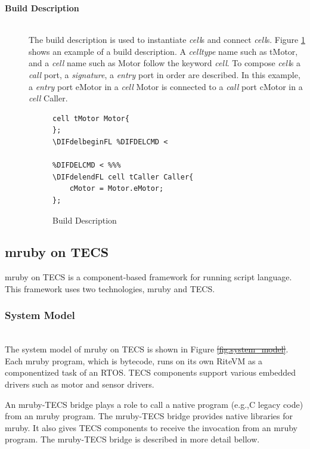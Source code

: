 \documentclass[conference,compsoc]{IEEEtran}
\providecommand{\DIFadd}[1]{{\protect\color{blue}\uwave{#1}}} %
\providecommand{\DIFdel}[1]{{\protect\color{red}\sout{#1}}}                      %
\providecommand{\DIFaddbegin}{} %
\providecommand{\DIFaddend}{} %
\providecommand{\DIFdelbegin}{} %
\providecommand{\DIFdelend}{} %
\providecommand{\DIFdelbeginFL}{} %
\providecommand{\DIFdelendFL}{} %
\begin{document}
\begin{description}
    \item[{\bf Build Description}]\mbox{}\\
        The build description is used to instantiate {\it cell}s and connect {\it cell}s.
        Figure \ref{build} shows an example of a build description.
        A {\it celltype} name such as tMotor, and a {\it cell} name such as Motor follow the keyword {\it cell}.
        To compose {\it cell}s a {\it call} port, a {\it signature}, a {\it entry} port in order are described.
        In this example, a {\it entry} port eMotor in a {\it cell} Motor is connected to a {\it call} port cMotor in a {\it cell} Caller.\\
\begin{figure}[t]
\centering
\begin{lstlisting}
cell tMotor Motor{
};
\DIFdelbeginFL %DIFDELCMD < 

%DIFDELCMD < %%%
\DIFdelendFL cell tCaller Caller{
    cMotor = Motor.eMotor;
};
\end{lstlisting}
\caption{Build Description}
\label{build}
\end{figure}

\end{description}

\subsection{mruby on TECS}
\label{sec:mruby on TECS}
mruby on TECS is a component-based framework for running script language.
This framework uses two technologies, mruby and TECS.

\subsubsection{System Model}\mbox{}\\

The system model of mruby on TECS is shown in Figure \DIFdelbegin \DIFdel{\ref{fig:system_model}}\DIFdelend \DIFaddbegin \DIFadd{\ref{fig:mrubyontecs}}\DIFaddend .
Each mruby program, which is bytecode, runs on its own RiteVM as a componentized task of an RTOS.
TECS components support various embedded drivers such as motor and sensor drivers.

An mruby-TECS bridge plays a role to call a native program (e.g.,C legacy code) from an mruby program.
The mruby-TECS bridge provides native libraries for mruby.
It also gives TECS components to receive the invocation from an mruby program.
The mruby-TECS bridge is described in more detail bellow.
\end{document}
